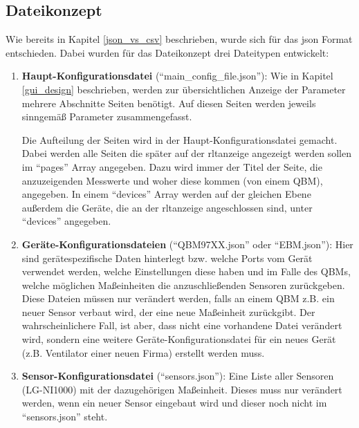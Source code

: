 \subsection{Dateikonzept} \label{json_config_files}
Wie bereits in Kapitel \ref{json_vs_csv} beschrieben, wurde sich für das \acs{json} Format entschieden. Dabei wurden für das Dateikonzept drei Dateitypen entwickelt:


\begin{enumerate}
	\item \textbf{Haupt-Konfigurationsdatei} (\enquote{main\_config\_file.json}): Wie in Kapitel \ref{gui_design} beschrieben, werden zur übersichtlichen  Anzeige der Parameter mehrere Abschnitte \bzw Seiten benötigt. Auf diesen Seiten werden jeweils sinngemäß Parameter zusammengefasst. 
	
	Die Aufteilung der Seiten wird in der Haupt-Konfigurationsdatei gemacht. Dabei werden alle Seiten die später auf der \acs{rltanzeige} angezeigt werden sollen im \enquote{pages} Array angegeben. Dazu wird immer der Titel der Seite, die anzuzeigenden Messwerte und woher diese kommen (\zB von einem QBM), angegeben. 
	In einem \enquote{devices} Array werden auf der gleichen Ebene außerdem die Geräte, die an der \acs{rltanzeige} angeschlossen sind, unter \enquote{devices} angegeben.
	
	\item \textbf{Geräte-Konfigurationsdateien} (\zB \enquote{QBM97XX.json} oder \enquote{EBM.json}): Hier sind gerätespezifische Daten hinterlegt bzw. welche Ports vom Gerät verwendet werden, welche Einstellungen diese haben und im Falle des QBMs, welche möglichen Maßeinheiten die anzuschließenden Sensoren zurückgeben. Diese Dateien müssen nur verändert werden, falls an einem QBM z.B. ein neuer Sensor verbaut wird, der eine neue Maßeinheit zurückgibt. Der wahrscheinlichere Fall, ist aber, dass nicht eine vorhandene Datei verändert wird, sondern eine weitere Geräte-Konfigurationsdatei für ein neues Gerät (z.B. Ventilator einer neuen Firma) erstellt werden muss.
	
	\item \textbf{Sensor-Konfigurationsdatei} (\enquote{sensors.json}): Eine Liste aller Sensoren (\zB LG-NI1000) mit der dazugehörigen Maßeinheit. Dieses muss nur verändert werden, wenn ein neuer Sensor eingebaut wird und dieser noch nicht im \enquote{sensors.json} steht.
\end{enumerate}

